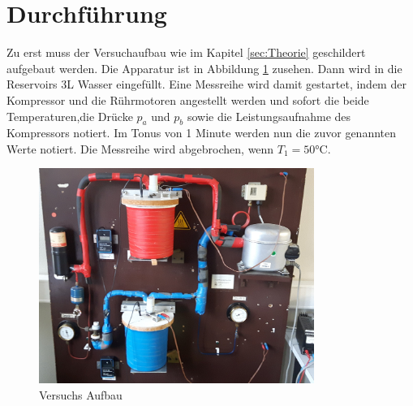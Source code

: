 \section{Durchführung}
\label{sec:Durchführung}
Zu erst muss der Versuchaufbau wie im Kapitel \ref{sec:Theorie} geschildert
aufgebaut werden. Die Apparatur ist in Abbildung \ref{fig:aufbau} zusehen.
Dann wird in die Reservoirs 3\si{\liter} Wasser eingefüllt. Eine Messreihe wird
damit gestartet, indem der Kompressor und die Rührmotoren angestellt werden und
sofort die beide Temperaturen,die Drücke $p_a$ und $p_b$ sowie
die Leistungsaufnahme des Kompressors notiert.
Im Tonus von 1 Minute werden nun die zuvor genannten Werte notiert. Die Messreihe wird
abgebrochen, wenn $T_1 = 50 \si{\celsius}$.
\begin{figure}
  \centering
  \includegraphics[height = 7cm]{logos/realAufbau.jpg}
  \caption{Versuchs Aufbau}
  \label{fig:aufbau}
\end{figure}
